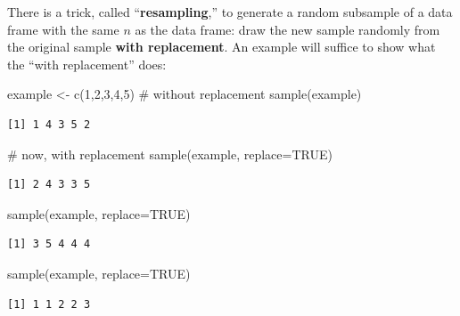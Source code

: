 \documentclass[
  letterpaper,
  DIV=11,
  numbers=noendperiod,
  oneside]{scrartcl}
\newenvironment{Shaded}{\begin{snugshade}}{\end{snugshade}}
\newcommand{\AttributeTok}[1]{\textcolor[rgb]{0.40,0.45,0.13}{#1}}
\newcommand{\CommentTok}[1]{\textcolor[rgb]{0.37,0.37,0.37}{#1}}
\newcommand{\ConstantTok}[1]{\textcolor[rgb]{0.56,0.35,0.01}{#1}}
\newcommand{\DecValTok}[1]{\textcolor[rgb]{0.68,0.00,0.00}{#1}}
\newcommand{\FunctionTok}[1]{\textcolor[rgb]{0.28,0.35,0.67}{#1}}
\newcommand{\NormalTok}[1]{\textcolor[rgb]{0.00,0.23,0.31}{#1}}
\newcommand{\OtherTok}[1]{\textcolor[rgb]{0.00,0.23,0.31}{#1}}
\begin{document}
There is a trick, called ``\textbf{resampling},'' to generate a random
subsample of a data frame with the same \(n\) as the data frame: draw
the new sample randomly from the original sample \textbf{with
replacement}. An example will suffice to show what the ``with
replacement'' does:

\begin{Shaded}
\begin{Highlighting}[]
\NormalTok{example }\OtherTok{\textless{}{-}} \FunctionTok{c}\NormalTok{(}\DecValTok{1}\NormalTok{,}\DecValTok{2}\NormalTok{,}\DecValTok{3}\NormalTok{,}\DecValTok{4}\NormalTok{,}\DecValTok{5}\NormalTok{)}
\CommentTok{\# without replacement}
\FunctionTok{sample}\NormalTok{(example)}
\end{Highlighting}
\end{Shaded}

\begin{verbatim}
[1] 1 4 3 5 2
\end{verbatim}

\begin{Shaded}
\begin{Highlighting}[]
\CommentTok{\# now, with replacement}
\FunctionTok{sample}\NormalTok{(example, }\AttributeTok{replace=}\ConstantTok{TRUE}\NormalTok{)}
\end{Highlighting}
\end{Shaded}

\begin{verbatim}
[1] 2 4 3 3 5
\end{verbatim}

\begin{Shaded}
\begin{Highlighting}[]
\FunctionTok{sample}\NormalTok{(example, }\AttributeTok{replace=}\ConstantTok{TRUE}\NormalTok{)}
\end{Highlighting}
\end{Shaded}

\begin{verbatim}
[1] 3 5 4 4 4
\end{verbatim}

\begin{Shaded}
\begin{Highlighting}[]
\FunctionTok{sample}\NormalTok{(example, }\AttributeTok{replace=}\ConstantTok{TRUE}\NormalTok{)}
\end{Highlighting}
\end{Shaded}

\begin{verbatim}
[1] 1 1 2 2 3
\end{verbatim}
\end{document}
